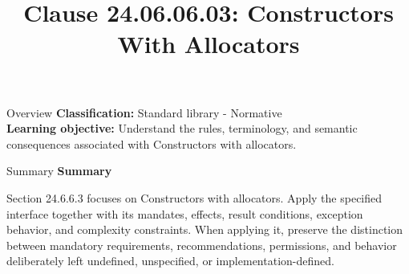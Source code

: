 \documentclass[10pt,letterpaper]{article}
\title{Clause 24.06.06.03: Constructors With Allocators}
\author{}
\date{}
\begin{document}
\maketitle
\begin{CornellOverviewBox}{Overview}
\textbf{Classification:} Standard library - Normative\\[2pt]
\textbf{Learning objective:} Understand the rules, terminology, and semantic consequences associated with Constructors with allocators.
\end{CornellOverviewBox}\begin{CornellSummaryBox}{Summary}
{\sffamily\bfseries\color{Accent} Summary}\par\vspace{3pt}Section 24.6.6.3 focuses on Constructors with allocators. Apply the specified interface together with its mandates, effects, result conditions, exception behavior, and complexity constraints. When applying it, preserve the distinction between mandatory requirements, recommendations, permissions, and behavior deliberately left undefined, unspecified, or implementation-defined.
\end{CornellSummaryBox}
\end{document}
